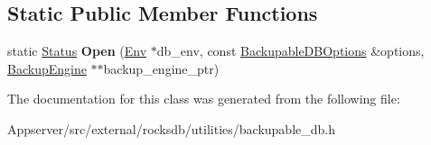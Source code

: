 \subsection*{Static Public Member Functions}
\begin{DoxyCompactItemize}
\item 
static \hyperlink{classrocksdb_1_1Status}{Status} {\bfseries Open} (\hyperlink{classrocksdb_1_1Env}{Env} $\ast$db\+\_\+env, const \hyperlink{structrocksdb_1_1BackupableDBOptions}{Backupable\+D\+B\+Options} \&options, \hyperlink{classrocksdb_1_1BackupEngine}{Backup\+Engine} $\ast$$\ast$backup\+\_\+engine\+\_\+ptr)\hypertarget{classrocksdb_1_1BackupEngine_a188d0f8e182da60f7670d9fb16beec12}{}\label{classrocksdb_1_1BackupEngine_a188d0f8e182da60f7670d9fb16beec12}

\end{DoxyCompactItemize}


The documentation for this class was generated from the following file\+:\begin{DoxyCompactItemize}
\item 
Appserver/src/external/rocksdb/utilities/backupable\+\_\+db.\+h\end{DoxyCompactItemize}
